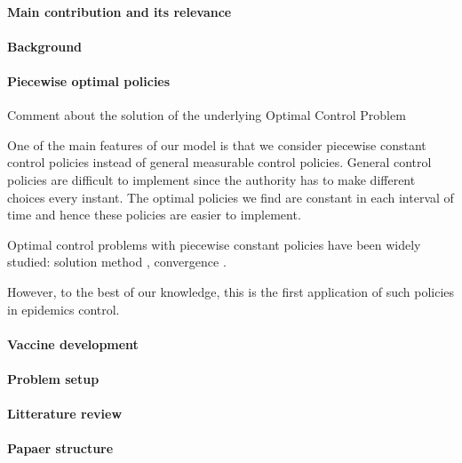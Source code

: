 \paragraph{Main contribution and its relevance}
\paragraph{Background}
\paragraph{Piecewise optimal policies}
    Comment about the solution of the underlying Optimal Control Problem
    
One of the main features of our model is that we consider piecewise constant control policies instead of general measurable control policies. General control policies are difficult to implement since the authority has to make different choices every instant. The optimal policies we find are constant in each interval of time and hence these policies are easier to implement. 

Optimal control problems with piecewise constant policies have been widely studied:  solution method \cite{MR3228405}, convergence \cite{MR3627992}.

However, to the best of our knowledge, this is the first application of such policies in epidemics control. 
     
\paragraph{Vaccine development}
\paragraph{Problem setup}
\paragraph{Litterature review}
\paragraph{Papaer structure}
